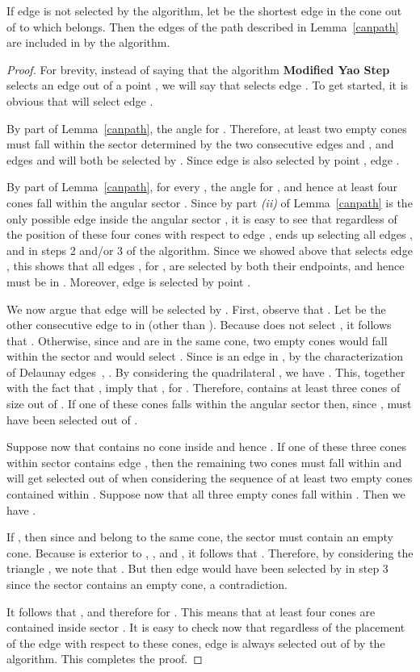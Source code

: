 \documentclass{stacs_proc}
\theoremstyle{plain}\newtheorem{satz}[thm]{Satz}
\begin{document}
\begin{lemma}
\label{edgeselected}
If edge  is not selected by the algorithm, let  be the shortest edge in
the cone out of  to which  belongs. Then the edges of the path
described in Lemma~\ref{canpath} are included in   by the algorithm.
\begin{proof}
For brevity, instead of saying that the algorithm {\bf Modified Yao
Step} selects an edge  out of a point , we will say that 
selects edge . To get started, it is obvious that  will select edge
.

By part  of Lemma~\ref{canpath}, the angle  for . Therefore, at least
two empty cones must fall within the sector 
determined by the two consecutive edges  and , and edges
 and  will both be selected by . Since edge  is
also selected by point , edge .

By part  of Lemma~\ref{canpath}, for every , the angle  for , and hence at least four cones fall within
the angular sector . Since by part {\em
(ii)} of Lemma~\ref{canpath}  is the only possible edge inside
the angular sector , it is easy to see
that regardless of the position of these four cones with respect to
edge ,  ends up selecting all edges ,
 and  in steps 2 and/or 3 of the algorithm. Since
we showed above that  selects edge , this shows that all
edges , for , are selected by both
their endpoints, and hence must be in . Moreover, edge
 is selected by point .

We now argue that edge  will be selected by . First, observe
that . 
Let  be the other consecutive edge to  in  (other than
). Because  does not select , it follows that
. Otherwise, since  and
 are in the same cone, two empty cones would fall within the
sector  and  would select . Since  is an edge
in , by the characterization of Delaunay edges~\cite{book},
. By considering the
quadrilateral , we have . This, together with the fact that
, imply that , for . Therefore,
 contains at least three cones of size 
out of . If one of these cones falls within the angular sector
 then, since ,  must
have been selected out of .

Suppose now that  contains no cone inside and
hence . If one of these three cones
within sector  contains edge , then the
remaining two cones must fall within  and 
will get selected out of  when considering the sequence of at
least two empty cones contained within . Suppose now
that all three empty cones fall within . Then we have
.

If , then since  and 
belong to the same cone, the sector  must contain an
empty cone. Because  is exterior to ,
, and ,
it follows that . Therefore, by considering the triangle
, we note that . But then edge 
would have been selected by  in step 3 since the sector
 contains an empty cone, a contradiction.

It follows that , and therefore
 for .
This means that at least four cones are contained inside sector
. It is easy to check now that regardless of the
placement of the edge  with respect to these cones, edge
 is always selected out of  by the algorithm. This
completes the proof.
\end{proof}
\end{lemma}
\end{document}
